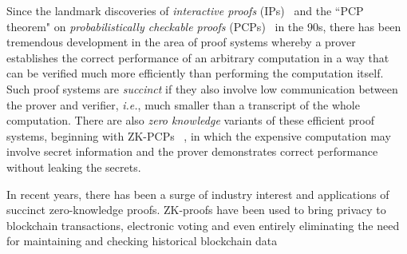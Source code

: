 
Since the landmark discoveries of \emph{interactive proofs} (IPs)~\cite{STOC:GolMicRac85} and the ``PCP theorem" on \emph{probabilistically checkable proofs} (PCPs)~\cite{STOC:BFLS91,FOCS:ALMSS92} in the 90s, there has been tremendous development in the area of proof systems whereby a prover establishes the correct performance of an arbitrary computation in a way that can be verified much more efficiently than performing the computation itself. Such proof systems are \emph{succinct} if they also involve low communication between the prover and verifier, \emph{i.e.}, much smaller than a transcript of the whole computation. There are also \emph{zero knowledge} variants of these efficient proof systems, beginning with ZK-PCPs~\cite{STOC:Kilian92} 
, in which the expensive computation may involve secret information and the prover demonstrates correct performance without leaking the secrets. 

In recent years, there has been a surge of industry interest and applications of succinct zero-knowledge proofs. ZK-proofs have been used to bring privacy to blockchain transactions\cite{SP:BCGGMT14}, electronic voting\cite{damgaard2003theory} and even entirely eliminating the need for maintaining and checking historical blockchain data~\cite{Coda} 

